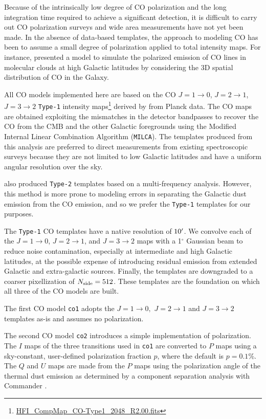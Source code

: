 \documentclass[twocolumn]{aastex631}
\begin{document}
Because of the intrinsically low degree of CO polarization and the long integration time required to achieve a significant detection, it is difficult to carry out CO polarization surveys and wide area measurements have not yet been made. In the absence of data-based templates, the approach to modeling CO has been to assume a small degree of polarization applied to total intensity maps. For instance, \citet{Puglisi:2017} presented a model to simulate the polarized emission of CO lines in molecular clouds at high Galactic latitudes by considering the 3D spatial distribution of CO in the Galaxy.

All CO models implemented here are based on the CO $J = 1\rightarrow0$, $J = 2\rightarrow1$, $J = 3\rightarrow2$ \texttt{Type-1} intensity maps\footnote{\url{HFI_CompMap_CO-Type1_2048_R2.00.fits}} derived by \citet{planck2013-p03a} from Planck data. The CO maps are obtained exploiting the mismatches in the detector bandpasses to recover the CO from the CMB and the other Galactic foregrounds using the Modified Internal Linear Combination Algorithm (\texttt{MILCA}). The templates produced from this analysis are preferred to direct measurements from existing spectroscopic surveys \citep[e.g.,][]{Dame:2001} because they are not limited to low Galactic latitudes and have a uniform angular resolution over the sky.

\citet{planck2013-p03a} also produced \texttt{Type-2} templates based on a multi-frequency analysis. However, this method is more prone to modeling errors in separating the Galactic dust emission from the CO emission, and so we prefer the \texttt{Type-1} templates for our purposes.

The \texttt{Type-1} CO templates have a native resolution of $10\mbox{$^\prime$}$. We convolve each of the $J = 1\rightarrow0$, $J = 2\rightarrow1$, and $J = 3\rightarrow2$ maps with a 1$^\circ$ Gaussian beam to reduce noise contamination, especially at intermediate and high Galactic latitudes, at the possible expense of introducing residual emission from extended Galactic and extra-galactic sources. Finally, the templates are downgraded to a coarser pixellization of $N_{\rm side} = 512$. These templates are the foundation on which all three of the CO models are built.

The first CO model \texttt{co1} adopts the $J = 1\rightarrow0,$  $J = 2\rightarrow1$ and $J = 3\rightarrow2$ templates as-is and assumes no polarization. 

The second CO model \texttt{co2} introduces a simple implementation of polarization. The $I$ maps of the three transitions used in \texttt{co1} are converted to $P$ maps using a sky-constant, user-defined polarization fraction $p$, where the default is $p = 0.1$\%. The $Q$ and $U$ maps are made from the $P$ maps using the polarization angle of the thermal dust emission as determined by a component separation analysis with Commander \citep{planck2014-a12}.
\end{document}
